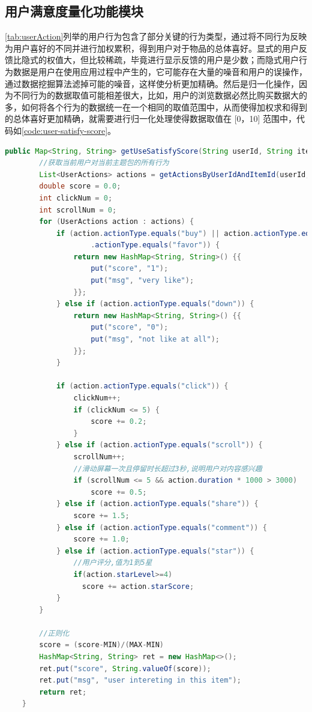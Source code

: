   \subsection{用户满意度量化功能模块}
    \autoref{tab:userAction}列举的用户行为包含了部分关键的行为类型，通过将不同行为反映为用户喜好的不同并进行加权累积，得到用户对于物品的总体喜好。显式的用户反馈比隐式的权值大，但比较稀疏，毕竟进行显示反馈的用户是少数；而隐式用户行为数据是用户在使用应用过程中产生的，它可能存在大量的噪音和用户的误操作，通过数据挖掘算法滤掉可能的噪音，这样使分析更加精确。然后是归一化操作，因为不同行为的数据取值可能相差很大，比如，用户的浏览数据必然比购买数据大的多，如何将各个行为的数据统一在一个相同的取值范围中，从而使得加权求和得到的总体喜好更加精确，就需要进行归一化处理使得数据取值在 [0，10] 范围中，代码如\autoref{code:user-satisfy-score}。
  \begin{lstlisting}[language=java,firstnumber=1,label={code:user-satisfy-score}, caption={用户满意度量化算法}]
    public Map<String, String> getUseSatisfyScore(String userId, String itemId) {
        //获取当前用户对当前主题包的所有行为
        List<UserActions> actions = getActionsByUserIdAndItemId(userId, itemId);
        double score = 0.0;
        int clickNum = 0;
        int scrollNum = 0;
        for (UserActions action : actions) {
            if (action.actionType.equals("buy") || action.actionType.equals("tryUse") || action
                    .actionType.equals("favor")) {
                return new HashMap<String, String>() {{
                    put("score", "1");
                    put("msg", "very like");
                }};
            } else if (action.actionType.equals("down")) {
                return new HashMap<String, String>() {{
                    put("score", "0");
                    put("msg", "not like at all");
                }};
            } 

            if (action.actionType.equals("click")) {
                clickNum++;
                if (clickNum <= 5) {
                    score += 0.2;
                }
            } else if (action.actionType.equals("scroll")) {
                scrollNum++;
                //滑动屏幕一次且停留时长超过3秒,说明用户对内容感兴趣
                if (scrollNum <= 5 && action.duration * 1000 > 3000) 
                    score += 0.5;
            } else if (action.actionType.equals("share")) {
                score += 1.5;
            } else if (action.actionType.equals("comment")) {
                score += 1.0;
            } else if (action.actionType.equals("star")) {
                //用户评分,值为1到5星
                if(action.starLevel>=4)
                  score += action.starScore;
            }
        }

        //正则化
        score = (score-MIN)/(MAX-MIN)
        HashMap<String, String> ret = new HashMap<>();
        ret.put("score", String.valueOf(score));
        ret.put("msg", "user intereting in this item");
        return ret;
    }
  \end{lstlisting}


